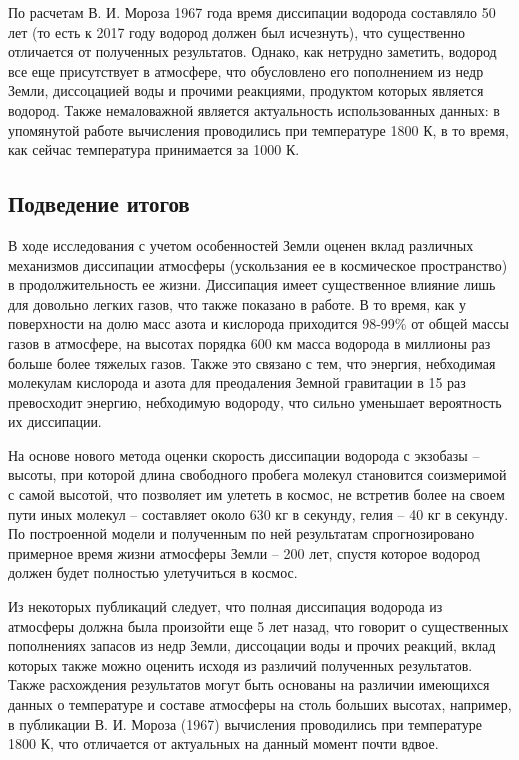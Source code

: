 \documentclass[12pt,a4paper]{article}
\begin{document}
По расчетам В. И. Мороза 1967 года время диссипации водорода составляло 50 лет (то есть к 2017 году водород должен был исчезнуть), что существенно отличается от полученных результатов.
Однако, как нетрудно заметить, водород все еще присутствует в атмосфере, что обусловлено его пополнением из недр Земли, диссоцацией воды и прочими реакциями, продуктом которых является водород.
Также немаловажной является актуальность использованных данных: в упомянутой работе вычисления проводились при температуре 1800 К, в то время, как сейчас температура принимается за 1000 К.

\newpage
\subsection*{Подведение итогов}
В ходе исследования с учетом особенностей Земли оценен вклад различных механизмов диссипации атмосферы (ускользания ее в космическое пространство) в продолжительность ее жизни.
Диссипация имеет существенное влияние лишь для довольно легких газов, что также показано в работе.
В то время, как у поверхности на долю масс азота и кислорода приходится 98-99\% от общей массы газов в атмосфере, на высотах порядка 600 км масса водорода в миллионы раз больше более тяжелых газов.
Также это связано с тем, что энергия, небходимая молекулам кислорода и азота для преодаления Земной гравитации в 15 раз превосходит энергию, небходимую водороду, что сильно уменьшает вероятность их диссипации.

На основе нового метода оценки скорость диссипации водорода с экзобазы -- высоты, при которой длина свободного пробега молекул становится соизмеримой с самой высотой, что позволяет им улететь в космос, не встретив более на своем пути иных молекул -- составляет около 630 кг в секунду, гелия -- 40 кг в секунду.
По построенной модели и полученным по ней результатам спрогнозировано примерное время жизни атмосферы Земли -- 200 лет, спустя которое водород должен будет полностью улетучиться в космос.

Из некоторых публикаций следует, что полная диссипация водорода из атмосферы должна была произойти еще 5 лет назад, что говорит о существенных пополнениях запасов из недр Земли, диссоцации воды и прочих реакций, вклад которых также можно оценить исходя из различий полученных результатов.
Также расхождения результатов могут быть основаны на различии имеющихся данных о температуре и составе атмосферы на столь больших высотах, например, в публикации В. И. Мороза (1967) вычисления проводились при температуре 1800 К, что отличается от актуальных на данный момент почти вдвое.
\end{document}

